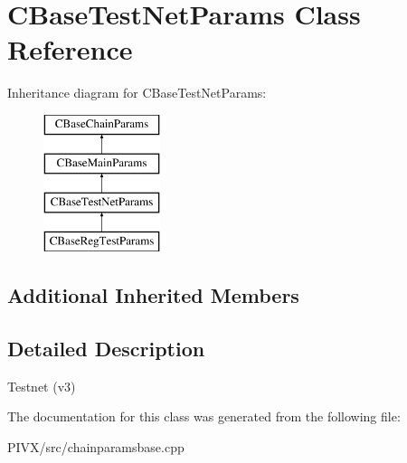 \hypertarget{class_c_base_test_net_params}{}\section{C\+Base\+Test\+Net\+Params Class Reference}
\label{class_c_base_test_net_params}
Inheritance diagram for C\+Base\+Test\+Net\+Params\+:\begin{figure}[H]
\begin{center}
\leavevmode
\includegraphics[height=4.000000cm]{class_c_base_test_net_params}
\end{center}
\end{figure}
\subsection*{Additional Inherited Members}


\subsection{Detailed Description}
Testnet (v3) 

The documentation for this class was generated from the following file\+:\begin{DoxyCompactItemize}
\item 
P\+I\+V\+X/src/chainparamsbase.\+cpp\end{DoxyCompactItemize}
